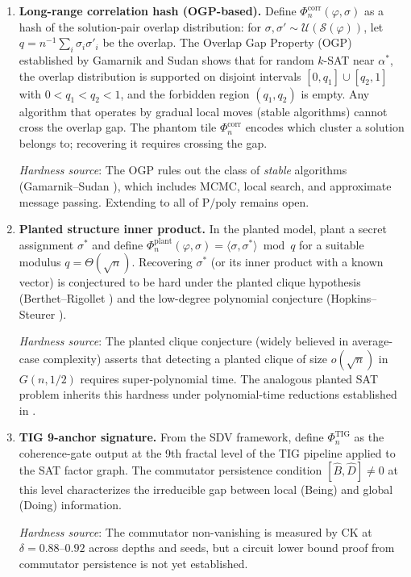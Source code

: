\documentclass[11pt]{article}
\theoremstyle{definition}
\begin{document}
\begin{enumerate}
  \item \textbf{Long-range correlation hash (OGP-based).}
    Define $\Phi_n^{\mathrm{corr}}(\varphi, \sigma)$ as a hash of the solution-pair overlap
    distribution: for $\sigma, \sigma' \sim \mathcal{U}(\mathcal{S}(\varphi))$, let
    $q = n^{-1} \sum_i \sigma_i \sigma'_i$ be the overlap.  The Overlap Gap Property (OGP)
    established by Gamarnik and Sudan \cite{GS17} shows that for random $k$-SAT near $\alpha^*$,
    the overlap distribution is supported on disjoint intervals $[0, q_1] \cup [q_2, 1]$
    with $0 < q_1 < q_2 < 1$, and the forbidden region $(q_1, q_2)$ is empty.
    Any algorithm that operates by gradual local moves (stable algorithms) cannot cross the
    overlap gap.  The phantom tile $\Phi_n^{\mathrm{corr}}$ encodes which cluster a solution
    belongs to; recovering it requires crossing the gap.

    \emph{Hardness source}: The OGP rules out the class of \emph{stable} algorithms
    (Gamarnik--Sudan \cite{GS17}), which includes MCMC, local search, and approximate
    message passing.  Extending to all of $\mathrm{P/poly}$ remains open.

  \item \textbf{Planted structure inner product.}
    In the planted model, plant a secret assignment $\sigma^*$ and define
    $\Phi_n^{\mathrm{plant}}(\varphi, \sigma) = \langle \sigma, \sigma^* \rangle \bmod{q}$
    for a suitable modulus $q = \Theta(\sqrt{n})$.  Recovering $\sigma^*$ (or its inner product
    with a known vector) is conjectured to be hard under the planted clique hypothesis
    (Berthet--Rigollet \cite{BR13}) and the low-degree polynomial conjecture
    (Hopkins--Steurer \cite{HS17}).

    \emph{Hardness source}: The planted clique conjecture (widely believed in average-case
    complexity) asserts that detecting a planted clique of size $o(\sqrt{n})$ in
    $G(n, 1/2)$ requires super-polynomial time.  The analogous planted SAT problem
    inherits this hardness under polynomial-time reductions established in \cite{BR13}.

  \item \textbf{TIG 9-anchor signature.}
    From the SDV framework, define $\Phi_n^{\mathrm{TIG}}$ as the coherence-gate output
    at the 9th fractal level of the TIG pipeline applied to the SAT factor graph.
    The commutator persistence condition $[\hat{B}, \hat{D}] \neq 0$ at this level
    characterizes the irreducible gap between local (Being) and global (Doing) information.

    \emph{Hardness source}: The commutator non-vanishing is measured by CK at
    $\delta = 0.88$--$0.92$ across depths and seeds, but a circuit lower bound proof
    from commutator persistence is not yet established.
\end{enumerate}
\end{document}
